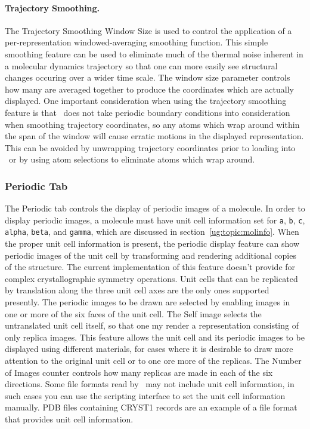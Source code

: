 \paragraph{Trajectory Smoothing.}
The {\sf Trajectory Smoothing Window Size} is used to control the application
of a per-representation windowed-averaging smoothing function.  This simple
smoothing feature can be used to eliminate much of the thermal noise inherent
in a molecular dynamics trajectory so that one can more easily see structural
changes occuring over a wider time scale.  The window size parameter controls
how many \timesteps are averaged together to produce the coordinates which
are actually displayed.  One important consideration
when using the trajectory smoothing feature is that \VMD\ does not take
periodic boundary conditions into consideration when smoothing trajectory
coordinates, so any atoms which wrap around within the span of the window will
cause erratic motions in the displayed representation.  This can be avoided by
unwrapping trajectory coordinates prior to loading into \VMD\ or by using atom
selections to eliminate atoms which wrap around.


\subsubsection{Periodic Tab}
The {\sf Periodic} tab controls the display of periodic images of a
molecule.  In order to display periodic images, a molecule must have
unit cell information set for {\tt a}, {\tt b}, {\tt c}, 
{\tt alpha}, {\tt beta}, and {\tt gamma}, which are discussed in 
section~\ref{ug:topic:molinfo}.  
When the proper unit cell information is present, the periodic display
feature can show periodic images of the unit cell by transforming and 
rendering additional copies of the structure.  The current implementation
of this feature doesn't provide for complex crystallographic symmetry 
operations.  Unit cells that can be replicated by translation along the 
three unit cell axes are the only ones supported presently.  The periodic
images to be drawn are selected by enabling images in one or more of 
the six faces of the unit cell.  The {\sf Self} image selects the 
untranslated unit cell itself, so that one my render a representation
consisting of only replica images.  This feature allows the unit cell
and its periodic images to be displayed using different materials, for
cases where it is desirable to draw more attention to the original unit
cell or to one ore more of the replicas.  The {\sf Number of Images}
counter controls how many replicas are made in each of the six directions.
Some file formats read by \VMD\ may not include unit cell information, 
in such cases you can use the scripting interface to set the unit cell 
information manually.  {PDB} files containing {CRYST1} records are an 
example of a file format that provides unit cell information.


